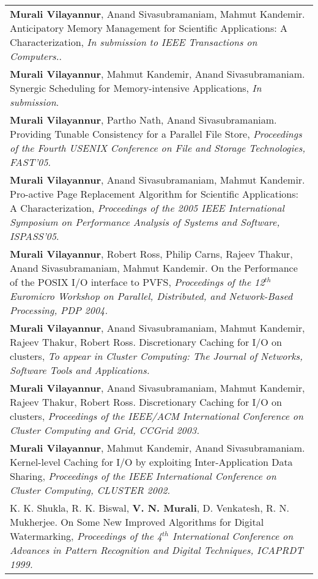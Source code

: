 \documentclass{article}
\begin{document}
  \begin{center}
  \begin{tabularx}{6.2in}{X}
	\vspace*{0.01in}
  {\bf Murali Vilayannur}, Anand Sivasubramaniam, Mahmut Kandemir.
  Anticipatory Memory Management for Scientific Applications: A Characterization,
  \emph {In submission to IEEE Transactions on Computers.}.\\
	\vspace*{0.01in}
  {\bf Murali Vilayannur}, Mahmut Kandemir, Anand Sivasubramaniam.
  Synergic Scheduling for Memory-intensive Applications,
  \emph {In submission}.\\
  \vspace*{0.01in}
  {\bf Murali Vilayannur}, Partho Nath, Anand Sivasubramaniam.
  Providing Tunable Consistency for a Parallel File Store,
  \emph {Proceedings of the Fourth USENIX Conference on File and Storage Technologies,
  FAST'05}.\\
   \vspace*{0.01in}
   {\bf Murali Vilayannur}, Anand Sivasubramaniam, Mahmut Kandemir.  
	Pro-active Page Replacement Algorithm for Scientific Applications: A Characterization, 
	\emph {Proceedings of the 2005 IEEE International Symposium on Performance Analysis of Systems and
	Software, ISPASS'05}. \\
   \vspace*{0.01in}
   {\bf Murali Vilayannur}, Robert Ross, Philip Carns, Rajeev Thakur, Anand Sivasubramaniam,
	Mahmut Kandemir. On the Performance of the POSIX I/O interface to PVFS,  \emph{Proceedings
	of the 12$^{th}$ Euromicro Workshop on Parallel, Distributed, and Network-Based Processing, PDP
	2004.} \\
   \vspace*{0.01in}
	{\bf Murali Vilayannur}, Anand Sivasubramaniam, Mahmut Kandemir, Rajeev Thakur, Robert Ross.
	Discretionary Caching for I/O on clusters, \emph{To appear in Cluster Computing: The Journal of
	Networks, Software Tools and Applications.} \\
   \vspace*{0.01in}
	{\bf Murali Vilayannur}, Anand Sivasubramaniam, Mahmut Kandemir, Rajeev Thakur, Robert Ross.
	Discretionary Caching for I/O on clusters, \emph{Proceedings of the IEEE/ACM
	International Conference on Cluster Computing and Grid, CCGrid 2003.} \\
   \vspace*{0.01in}
   {\bf Murali Vilayannur}, Mahmut Kandemir, Anand Sivasubramaniam. 
   Kernel-level Caching for I/O by exploiting Inter-Application Data Sharing, \emph{Proceedings of
   the IEEE International Conference on Cluster Computing, CLUSTER 2002.} \\
   \vspace*{0.01in}
   K. K. Shukla, R. K. Biswal, {\bf V. N. Murali}, D. Venkatesh, R. N. Mukherjee. 
	On Some New Improved Algorithms for Digital Watermarking, \emph{Proceedings of the 4$^{th}$
	International Conference on Advances in Pattern Recognition and Digital Techniques, ICAPRDT 1999.} \\
	\end{tabularx}
  \end{center}
\end{document}
